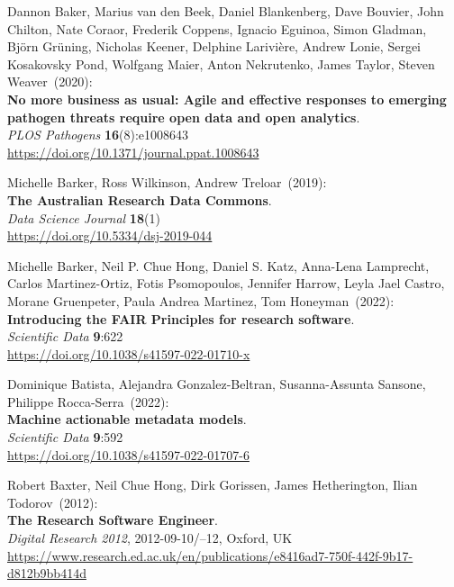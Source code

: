 \begin{thebibliography}{9}
Dannon Baker, Marius van den Beek, Daniel Blankenberg, Dave Bouvier, John Chilton, Nate Coraor, Frederik Coppens, Ignacio Eguinoa, Simon Gladman, Björn Grüning, Nicholas Keener, Delphine Larivière, Andrew Lonie, Sergei Kosakovsky Pond, Wolfgang Maier, Anton Nekrutenko, James Taylor, Steven Weaver~(2020): \\
\textbf{No more business as usual: Agile and effective responses to emerging pathogen threats require open data and open analytics}.\\
\emph{PLOS Pathogens} \textbf{16}(8):e1008643 \\
\url{https://doi.org/10.1371/journal.ppat.1008643}

Michelle Barker, Ross Wilkinson, Andrew Treloar~(2019): \\
\textbf{The Australian Research Data Commons}.\\
\emph{Data Science Journal} \textbf{18}(1) \\
\url{https://doi.org/10.5334/dsj-2019-044}

Michelle Barker, Neil P. Chue Hong, Daniel S. Katz, Anna-Lena Lamprecht, Carlos Martinez-Ortiz, Fotis Psomopoulos, Jennifer Harrow, Leyla Jael Castro, Morane Gruenpeter, Paula Andrea Martinez, Tom Honeyman~(2022):\\
\textbf{Introducing the FAIR Principles for research software}.\\
\emph{Scientific Data} \textbf{9}:622 \\
\url{https://doi.org/10.1038/s41597-022-01710-x}

Dominique Batista, Alejandra Gonzalez-Beltran, Susanna-Assunta Sansone, Philippe Rocca-Serra~(2022): \\
\textbf{Machine actionable metadata models}.\\
\emph{Scientific Data} \textbf{9}:592 \\
\url{https://doi.org/10.1038/s41597-022-01707-6}

Robert Baxter, Neil Chue Hong, Dirk Gorissen, James Hetherington, Ilian Todorov~(2012): \\
\textbf{The Research Software Engineer}.\\
\emph{Digital Research 2012}, 2012-09-10/--12, Oxford, UK\\
\url{https://www.research.ed.ac.uk/en/publications/e8416ad7-750f-442f-9b17-d812b9bb414d}


\end{thebibliography}

